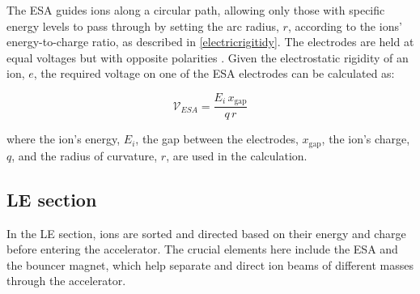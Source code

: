 The ESA guides ions along a circular path, allowing only those with specific energy levels to pass through by setting the arc radius, $r$, according to the ions’ energy-to-charge ratio, as described in \cref{electricrigitidy}. The electrodes are held at equal voltages but with opposite polarities \cite{HVEE2013}. Given the electrostatic rigidity of an ion, $e$, the required voltage on one of the ESA electrodes can be calculated as:

\begin{equation}
    \mathcal{V}_{ESA} = \frac{E_{i} \, x_{\text{gap}}}{q \, r}
\end{equation}

where the ion's energy, $E_i$, the gap between the electrodes, $x_{\text{gap}}$, the ion's charge, $q$, and the radius of curvature, $r$, are used in the calculation.


\subsection{LE section}

In the LE section, ions are sorted and directed based on their energy and charge before entering the accelerator. The crucial elements here include the ESA and the bouncer magnet, which help separate and direct ion beams of different masses through the accelerator.

